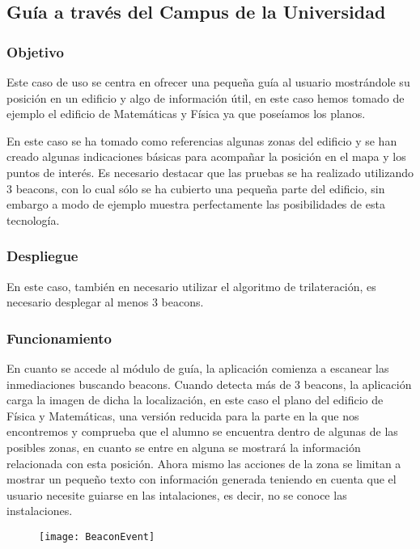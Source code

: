 \subsection{Guía a través del Campus de la Universidad}

\subsubsection{Objetivo}

Este caso de uso se centra en ofrecer una pequeña guía al usuario mostrándole su posición en un edificio y algo de información útil, en este caso hemos tomado de ejemplo el edificio de Matemáticas y Física ya que poseíamos los planos. 

En este caso se ha tomado como referencias algunas zonas del edificio y se han creado algunas indicaciones básicas para acompañar la posición en el mapa y los puntos de interés. Es necesario destacar que las pruebas se ha realizado utilizando 3 beacons, con lo cual sólo se ha cubierto una pequeña parte del edificio, sin embargo a modo de ejemplo muestra perfectamente las posibilidades de esta tecnología.

\subsubsection{Despliegue}

En este caso, también en necesario utilizar el algoritmo de trilateración, es necesario desplegar al menos 3 beacons.

\subsubsection{Funcionamiento}


En cuanto se accede al módulo de guía, la aplicación comienza a escanear las inmediaciones buscando beacons. Cuando detecta más de 3 beacons, la aplicación carga la imagen de dicha la localización, en este caso el plano del edificio de Física y Matemáticas, una versión reducida para la parte en la que nos encontremos y comprueba que el alumno se encuentra dentro de algunas de las posibles zonas, en cuanto se entre en alguna se mostrará la información relacionada con esta posición. Ahora mismo las acciones de la zona se limitan a mostrar un pequeño texto con información generada teniendo en cuenta que el usuario necesite guiarse en las intalaciones, es decir, no se conoce las instalaciones.

\begin{figure}[H]
	\centering
	\texttt{[image: BeaconEvent]}
	\label{fig:eventBeacon}
\end{figure}


